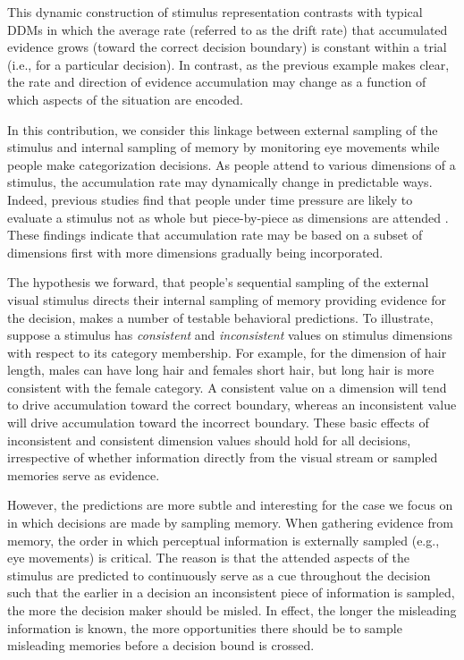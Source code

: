 \documentclass[man,floatsintext]{apa6}
\begin{document}
This dynamic construction of stimulus representation contrasts with typical DDMs in
which the average rate (referred to as the drift rate) that accumulated evidence grows (toward the
correct decision boundary) is constant within a trial (i.e., for a particular decision). In
contrast, as the previous example makes clear, the rate and direction of evidence accumulation may
change as a function of which aspects of the situation are encoded.

In this contribution, we consider this linkage between external sampling of the stimulus and
internal sampling of memory by monitoring eye movements while people make categorization decisions.
As people attend to various dimensions of a stimulus, the accumulation rate may dynamically change
in predictable ways. Indeed, previous studies find that people under time pressure are likely to
evaluate a stimulus not as whole but piece-by-piece as dimensions are attended 
\parencite[e.g.,][]{Lamberts1995a, Lamberts2000a, Cohen2003a}. These findings indicate that
accumulation rate may be based on a subset of dimensions first with more dimensions gradually being
incorporated.

The hypothesis we forward, that people's sequential sampling of the external visual stimulus directs
their internal sampling of memory providing evidence for the decision, makes a number of testable
behavioral predictions. To illustrate, suppose a stimulus has \textit{consistent} and
\textit{inconsistent} values on stimulus dimensions with respect to its category membership. For
example, for the dimension of hair length, males can have long hair and females short hair, but
long hair is more consistent with the female category. A consistent value on a dimension will tend
to drive accumulation toward the correct boundary, whereas an inconsistent value will drive
accumulation toward the incorrect boundary. These basic effects of inconsistent and consistent
dimension values should hold for all decisions, irrespective of whether information directly from
the visual stream or sampled memories serve as evidence.

However, the predictions are more subtle and interesting for the case we focus on in which decisions
are made by sampling memory. When gathering evidence from memory, the order in which perceptual
information is externally sampled (e.g., eye movements) is critical. The reason is that the attended
aspects of the stimulus are predicted to continuously serve as a cue throughout the decision such
that the earlier in a decision an inconsistent piece of information is sampled, the more the
decision maker should be misled. In effect, the longer the misleading information is known, the more
opportunities there should be to sample misleading memories before a decision bound is crossed.
\end{document}
